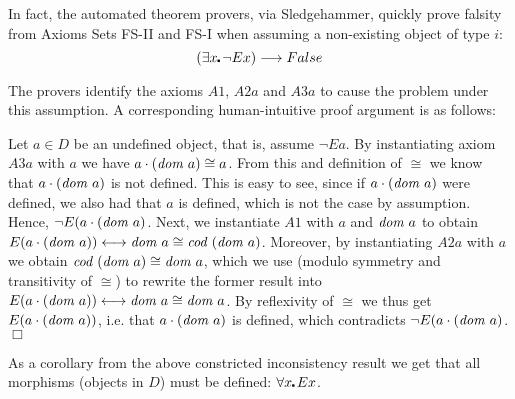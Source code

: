 In fact, the automated theorem provers, via Sledgehammer, quickly
prove falsity from Axioms Sets FS-II and FS-I when assuming a 
 non-existing object of type $i$:
$$(\exists x\lambdot \neg E x) \imp False$$

The provers identify the axioms $A1$,
 $A2a$ and $A3a$ to cause the problem under this assumption. A
 corresponding  human-intuitive proof argument is as follows:
 
 Let $a\in D$ be an undefined object, that is, assume $¬E a$.  By
 instantiating axiom $A3a$ with $a$ we have $a \cdot (\textit{dom \/} a) \cong a$.  From
 this and definition of $\cong$ we know that $a \cdot (\textit{dom \/} a)$ is not
 defined. This is easy to see, since if $a \cdot (\textit{dom \/} a)$ were defined, we
 also had that $a$ is defined, which is not the case by assumption.
  Hence, $\neg E (a \cdot (\textit{dom \/} a)$.
Next, we instantiate $A1$ with $a$ and $\textit{dom \/} a$ to obtain
   $E(a \cdot (\textit{dom \/} a)) \longleftrightarrow \textit{dom \/} a \cong \textit{cod \/}(\textit{dom \/} a)$. Moreover,
   by instantiating $A2a$ with $a$ we obtain $\textit{cod \/}(\textit{dom \/} a) \cong \textit{dom \/} a$,
   which we use (modulo symmetry and transitivity of $\cong$) to
   rewrite the former result into 
   $E(a \cdot (\textit{dom \/} a)) \longleftrightarrow \textit{dom \/} a \cong \textit{dom \/} a$. By reflexivity of
   $\cong$ we thus get $E(a \cdot (\textit{dom \/} a))$, i.e. that $a \cdot
   (\textit{dom \/} a)$ is defined, which contradicts $\neg E (a \cdot (\textit{dom \/}
   a)$. $\Box$

As a corollary from the above constricted inconsistency result we get
that all morphisms (objects in $D$) must be
defined: $\forall x\lambdot E x$.










